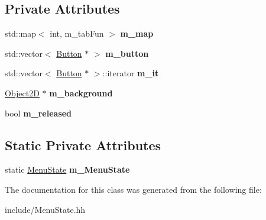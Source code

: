 \subsection*{Private Attributes}
\begin{DoxyCompactItemize}
\item 
\hypertarget{class_menu_state_a0b6aaa5ec234c01339e87211b532f970}{}std\+::map$<$ int, m\+\_\+tab\+Fun $>$ {\bfseries m\+\_\+map}\label{class_menu_state_a0b6aaa5ec234c01339e87211b532f970}

\item 
\hypertarget{class_menu_state_a12fc55b81bcef6508737f8bdfba2a1fb}{}std\+::vector$<$ \hyperlink{class_button}{Button} $\ast$ $>$ {\bfseries m\+\_\+button}\label{class_menu_state_a12fc55b81bcef6508737f8bdfba2a1fb}

\item 
\hypertarget{class_menu_state_a388551bbd8ef4eafb26c288bfa4c9a4f}{}std\+::vector$<$ \hyperlink{class_button}{Button} $\ast$ $>$\+::iterator {\bfseries m\+\_\+it}\label{class_menu_state_a388551bbd8ef4eafb26c288bfa4c9a4f}

\item 
\hypertarget{class_menu_state_a97958bf3122431c531bc7c0c66fb6ce2}{}\hyperlink{class_object2_d}{Object2\+D} $\ast$ {\bfseries m\+\_\+background}\label{class_menu_state_a97958bf3122431c531bc7c0c66fb6ce2}

\item 
\hypertarget{class_menu_state_aeac13889d5cb6aa1b0d4baffff68b22d}{}bool {\bfseries m\+\_\+released}\label{class_menu_state_aeac13889d5cb6aa1b0d4baffff68b22d}

\end{DoxyCompactItemize}
\subsection*{Static Private Attributes}
\begin{DoxyCompactItemize}
\item 
\hypertarget{class_menu_state_a21be7b30ca01edf715ebad73cf1cb068}{}static \hyperlink{class_menu_state}{Menu\+State} {\bfseries m\+\_\+\+Menu\+State}\label{class_menu_state_a21be7b30ca01edf715ebad73cf1cb068}

\end{DoxyCompactItemize}


The documentation for this class was generated from the following file\+:\begin{DoxyCompactItemize}
\item 
include/Menu\+State.\+hh\end{DoxyCompactItemize}
